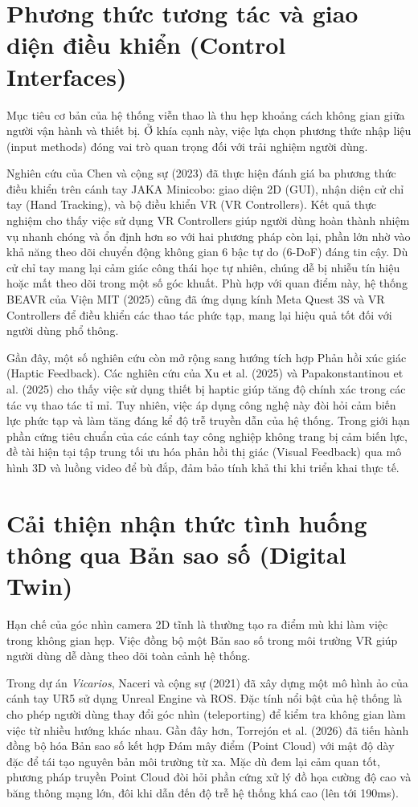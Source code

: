 \section{Phương thức tương tác và giao diện điều khiển (Control Interfaces)}
Mục tiêu cơ bản của hệ thống viễn thao là thu hẹp khoảng cách không gian giữa người vận hành và thiết bị. Ở khía cạnh này, việc lựa chọn phương thức nhập liệu (input methods) đóng vai trò quan trọng đối với trải nghiệm người dùng. 

Nghiên cứu của Chen và cộng sự (2023) \cite{chen2023comparing} đã thực hiện đánh giá ba phương thức điều khiển trên cánh tay JAKA Minicobo: giao diện 2D (GUI), nhận diện cử chỉ tay (Hand Tracking), và bộ điều khiển VR (VR Controllers). Kết quả thực nghiệm cho thấy việc sử dụng VR Controllers giúp người dùng hoàn thành nhiệm vụ nhanh chóng và ổn định hơn so với hai phương pháp còn lại, phần lớn nhờ vào khả năng theo dõi chuyển động không gian 6 bậc tự do (6-DoF) đáng tin cậy. Dù cử chỉ tay mang lại cảm giác công thái học tự nhiên, chúng dễ bị nhiễu tín hiệu hoặc mất theo dõi trong một số góc khuất. Phù hợp với quan điểm này, hệ thống BEAVR của Viện MIT (2025) \cite{arclab2025beavr} cũng đã ứng dụng kính Meta Quest 3S và VR Controllers để điều khiển các thao tác phức tạp, mang lại hiệu quả tốt đối với người dùng phổ thông.

Gần đây, một số nghiên cứu còn mở rộng sang hướng tích hợp Phản hồi xúc giác (Haptic Feedback). Các nghiên cứu của Xu et al. (2025) \cite{xu2025immersive} và Papakonstantinou et al. (2025) \cite{papakonstantinou2025effect} cho thấy việc sử dụng thiết bị haptic giúp tăng độ chính xác trong các tác vụ thao tác tỉ mỉ. Tuy nhiên, việc áp dụng công nghệ này đòi hỏi cảm biến lực phức tạp và làm tăng đáng kể độ trễ truyền dẫn của hệ thống. Trong giới hạn phần cứng tiêu chuẩn của các cánh tay công nghiệp không trang bị cảm biến lực, đề tài hiện tại tập trung tối ưu hóa phản hồi thị giác (Visual Feedback) qua mô hình 3D và luồng video để bù đắp, đảm bảo tính khả thi khi triển khai thực tế.

\section{Cải thiện nhận thức tình huống thông qua Bản sao số (Digital Twin)}
Hạn chế của góc nhìn camera 2D tĩnh là thường tạo ra điểm mù khi làm việc trong không gian hẹp. Việc đồng bộ một Bản sao số trong môi trường VR giúp người dùng dễ dàng theo dõi toàn cảnh hệ thống.

Trong dự án \textit{Vicarios}, Naceri và cộng sự (2021) \cite{naceri2021vicarios} đã xây dựng một mô hình ảo của cánh tay UR5 sử dụng Unreal Engine và ROS. Đặc tính nổi bật của hệ thống là cho phép người dùng thay đổi góc nhìn (teleporting) để kiểm tra không gian làm việc từ nhiều hướng khác nhau. Gần đây hơn, Torrejón et al. (2026) \cite{torrejon2026teleoperation} đã tiến hành đồng bộ hóa Bản sao số kết hợp Đám mây điểm (Point Cloud) với mật độ dày đặc để tái tạo nguyên bản môi trường từ xa. Mặc dù đem lại cảm quan tốt, phương pháp truyền Point Cloud đòi hỏi phần cứng xử lý đồ họa cường độ cao và băng thông mạng lớn, đôi khi dẫn đến độ trễ hệ thống khá cao (lên tới 190ms).

